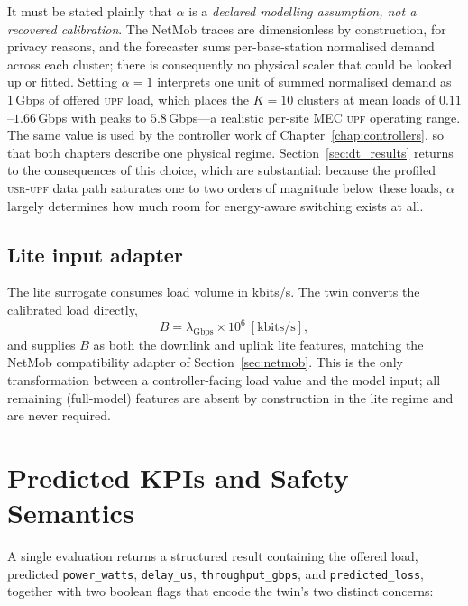 \documentclass[12pt, a4paper]{report}
\newcommand{\usr}{\textsc{usr-upf}}
\newcommand{\upf}{\textsc{upf}}
\newcommand{\code}[1]{\texttt{#1}}
\begin{document}
It must be stated plainly that $\alpha$ is a \emph{declared modelling
assumption, not a recovered calibration}. The NetMob traces are dimensionless
by construction, for privacy reasons, and the forecaster sums per-base-station
normalised demand across each cluster; there is consequently no physical
scaler that could be looked up or fitted. Setting $\alpha = 1$ interprets one
unit of summed normalised demand as 1\,Gbps of offered \upf{} load, which
places the $K = 10$ clusters at mean loads of $0.11$--$1.66$\,Gbps with peaks
to $5.8$\,Gbps---a realistic per-site MEC \upf{} operating range. The same
value is used by the controller work of Chapter~\ref{chap:controllers}, so
that both chapters describe one physical regime. Section~\ref{sec:dt_results}
returns to the consequences of this choice, which are substantial: because the
profiled \usr{} data path saturates one to two orders of magnitude below these
loads, $\alpha$ largely determines how much room for energy-aware switching
exists at all.

\subsection{Lite input adapter}

The lite surrogate consumes load volume in kbits/s. The twin converts the
calibrated load directly,
\begin{equation}
  B = \lambda_{\mathrm{Gbps}} \times 10^{6}~[\text{kbits/s}],
  \label{eq:dt_kbits}
\end{equation}
and supplies $B$ as both the downlink and uplink lite features, matching the
NetMob compatibility adapter of Section~\ref{sec:netmob}. This is the only
transformation between a controller-facing load value and the model input;
all remaining (full-model) features are absent by construction in the lite
regime and are never required.

\section{Predicted KPIs and Safety Semantics}
\label{sec:dt_kpis}

A single evaluation returns a structured result containing the offered load,
predicted \code{power\_watts}, \code{delay\_us}, \code{throughput\_gbps}, and
\code{predicted\_loss}, together with two boolean flags that encode the twin's
two distinct concerns:
\end{document}

